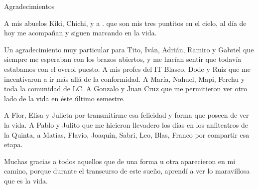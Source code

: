 \documentclass[12pt,papel,oneside]{ibtesis}
\begin{document}
\begin{postliminary}
\begin{seccion}{Agradecimientos}
\begin{footnotesize}
A mis abuelos Kiki, Chichi, y a . que son mis tres puntitos en el cielo, al día de hoy me acompañan y siguen marcando en la vida.

Un agradecimiento muy particular para Tito, Iván, Adrián, Ramiro y Gabriel  que siempre me esperaban con los brazos abiertos, y me hacían sentir que todavía estabamos con el overol puesto. A mis profes del IT Blasco, Dode y Ruiz que me incentivaron a ir más allá de la conformidad. A María, Nahuel, Mapi, Ferchu y toda la comunidad de LC. A Gonzalo y Juan Cruz que me permitieron ver otro lado de la vida en éste último semestre.

A Flor, Elisa y Julieta por transmitirme esa felicidad  y forma que poseen de  ver la vida. A Pablo y Julito que me hicieron llevadero los días en los anfiteatros de la Quinta,  a Matías, Flavio, Joaquín, Sabri, Leo, Blas, Franco por compartir esa etapa.

Muchas gracias a todos aquellos que de una forma u otra aparecieron en mi camino, porque durante el transcurso de este sueño, aprendí a ver lo maravillosa que es la vida.

\end{footnotesize}


\end{seccion}



\end{postliminary}
\end{document}
